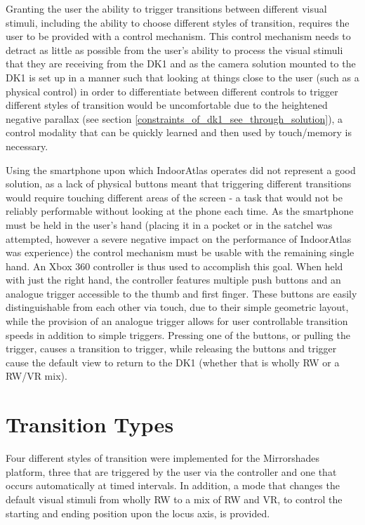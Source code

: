 Granting the user the ability to trigger transitions between different visual stimuli, including the ability to choose different styles of transition, requires the user to be provided with a control mechanism. This control mechanism needs to detract as little as possible from the user's ability to process the visual stimuli that they are receiving from the DK1 and as the camera solution mounted to the DK1 is set up in a manner such that looking at things close to the user (such as a physical control) in order to differentiate between different controls to trigger different styles of transition would be uncomfortable due to the heightened negative parallax (see section \ref{constraints_of_dk1_see_through_solution}), a control modality that can be quickly learned and then used by touch/memory is necessary.

Using the smartphone upon which IndoorAtlas operates did not represent a good solution, as a lack of physical buttons meant that triggering different transitions would require touching different areas of the screen - a task that would not be reliably performable without looking at the phone each time. As the smartphone must be held in the user's hand (placing it in a pocket or in the satchel was attempted, however a severe negative impact on the performance of IndoorAtlas was experience) the control mechanism must be usable with the remaining single hand. An Xbox 360 controller is thus used to accomplish this goal. When held with just the right hand, the controller features multiple push buttons and an analogue trigger accessible to the thumb and first finger. These buttons are easily distinguishable from each other via touch, due to their simple geometric layout, while the provision of an analogue trigger allows for user controllable transition speeds in addition to simple triggers. Pressing one of the buttons, or pulling the trigger, causes a transition to trigger, while releasing the buttons and trigger cause the default view to return to the DK1 (whether that is wholly RW or a RW/VR mix).


\section{Transition Types}

Four different styles of transition were implemented for the Mirrorshades platform, three that are triggered by the user via the controller and one that occurs automatically at timed intervals. In addition, a mode that changes the default visual stimuli from wholly RW to a mix of RW and VR, to control the starting and ending position upon the locus axis, is provided.

